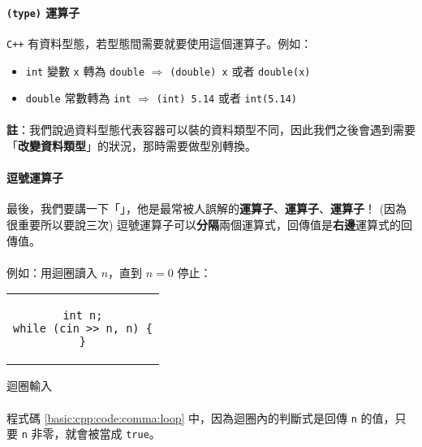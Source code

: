 \documentclass[12pt,a4paper,oneside]{report}
\begin{document}
\begin{CJK}{UTF8}{bkai}
\paragraph{\lstinline!(type)! 運算子}\texttt{C++} 有資料型態，若型態間需要就要使用這個運算子。例如：

\begin{itemize}
\item \lstinline!int! 變數 \lstinline!x! 轉為 \lstinline!double! $\Rightarrow$ \lstinline!(double) x! 或者 \lstinline!double(x)!
\item \lstinline!double! 常數轉為 \lstinline!int! 
$\Rightarrow$ \lstinline!(int) 5.14! 或者 \lstinline!int(5.14)!
\end{itemize}

\paragraph{}\textbf{註}：我們說過資料型態代表容器可以裝的資料類型不同，因此我們之後會遇到需要「\textbf{改變資料類型}」的狀況，那時需要做型別轉換。

\paragraph{逗號運算子}最後，我們要講一下「」，他是最常被人誤解的\textbf{運算子}、\textbf{運算子}、\textbf{運算子}！ (因為很重要所以要說三次) 逗號運算子可以\textbf{分隔}兩個運算式，回傳值是\textbf{右邊}運算式的回傳值。

\paragraph{}例如：用迴圈讀入 $n$，直到 $n=0$ 停止：

\begin{code}[h!]
\centering
\begin{tabular}{c}
\begin{lstlisting}
int n;
while (cin >> n, n) {
}
\end{lstlisting}
\end{tabular}
\caption{迴圈輸入}
\label{basic:cpp:code:comma:loop}
\end{code}

\paragraph{}程式碼 \ref{basic:cpp:code:comma:loop} 中，因為迴圈內的判斷式是回傳 \lstinline!n! 的值，只要 \lstinline!n! 非零，就會被當成 \lstinline!true!。


\end{CJK}
\end{document}
